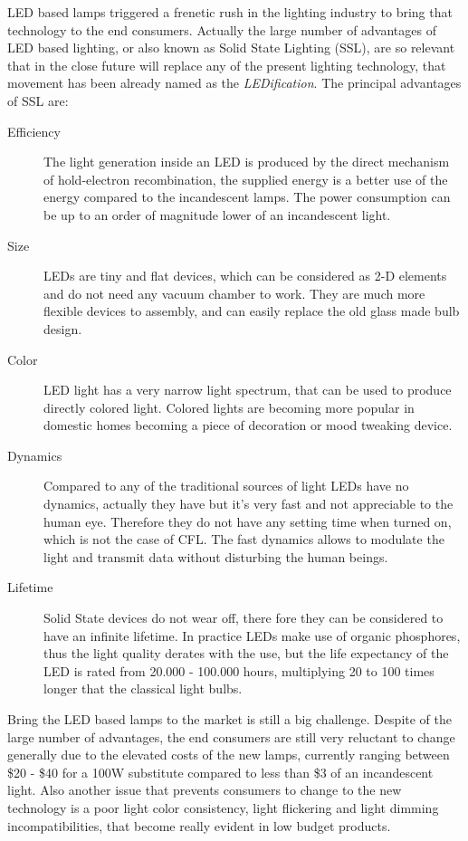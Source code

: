 LED based lamps triggered  a frenetic rush in the lighting industry to bring that technology to the end consumers. Actually the large number of advantages of LED based lighting, or also known as Solid State Lighting (SSL), are so relevant that in the close future will replace any of the present lighting technology, that movement has been already named as the \emph{LEDification}. The principal advantages of SSL are:
\begin{description}
  \item [Efficiency] The light generation inside an LED is produced by the direct mechanism of hold-electron recombination, the supplied energy is a better use of the energy compared to the incandescent lamps. The power consumption can be up to an order of magnitude lower of an incandescent light.

  \item [Size] LEDs are tiny and flat devices, which can be considered as 2-D elements and do not need any vacuum chamber to work. They are much more flexible devices to assembly, and can easily replace the old glass made bulb design.

  \item [Color] LED light has a very narrow light spectrum, that can be used to produce directly colored light. Colored lights are becoming more popular in domestic homes becoming a piece of decoration or mood tweaking device.

  \item [Dynamics] Compared to any of the traditional sources of light LEDs have no dynamics, actually they have but it's very fast and not appreciable to the human eye. Therefore they do not have any setting time when turned on, which is not the case of CFL. The fast dynamics allows to modulate the light and transmit data without disturbing the human beings.

  \item [Lifetime] Solid State devices do not wear off, there fore they can be considered to have an infinite lifetime. In practice LEDs make use of organic phosphores, thus the light quality derates with the use, but the life expectancy of the LED is rated from 20.000 - 100.000 hours, multiplying 20 to 100 times longer that the classical light bulbs.
\end{description}

Bring the LED based lamps to the market is still a big challenge. Despite of the large number of advantages, the end consumers are still very reluctant to change generally due to the elevated costs of the new lamps, currently ranging between \$20 - \$40 for a 100W substitute compared to less than \$3 of an incandescent light. Also another issue that prevents consumers to change to the new technology is a poor light color consistency, light flickering and light dimming incompatibilities, that become really evident in low budget products. 

